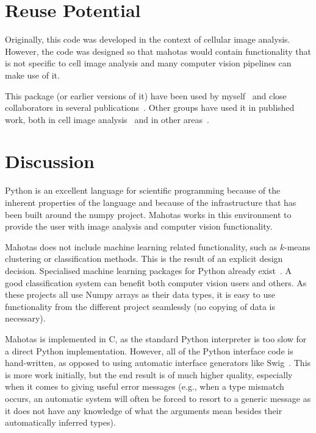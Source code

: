 \documentclass{scrartcl}
\newcommand*{\cpp}{{C\nolinebreak[4]\hspace{-.05em}\raisebox{.4ex}{\tiny\textbf{++}}}}
\begin{document}
\section{Reuse Potential}

Originally, this code was developed in the context of cellular image analysis.
However, the code was designed so that mahotas would contain functionality that
is not specific to cell image analysis and many computer vision pipelines can
make use of it.

This package (or earlier versions of it) have been used by
myself~\citep{Coelho2009,Coelho2010a} and close collaborators in several
publications~\citep{omerosearcher}. Other groups have used it in published
work, both in cell image analysis~\citep{CYTO:CYTO22034} and in other
areas~\citep{springerlink:10.1007/978-3-642-32335-5_2,ADFM:ADFM201300091}.

\section{Discussion}

Python is an excellent language for scientific programming because of the
inherent properties of the language and because of the infrastructure that has
been built around the numpy project. Mahotas works in this environment to
provide the user with image analysis and computer vision functionality.

Mahotas does not include machine learning related functionality, such as
$k$-means clustering or classification methods. This is the result of an
explicit design decision. Specialised machine learning packages for Python
already
exist~\citep{Pedregosa:2011:SML:2078183.2078195,springerlink:10.1007/978-3-540-30116-5_58,Schaul:2010:PYB:1756006.1756030,Sonnenburg:2010:SML:1756006.1859911}.
A good classification system can benefit both computer vision users
and others. As these projects all use Numpy arrays as their data types, it is
easy to use functionality from the different project seamlessly (no copying of
data is necessary).

Mahotas is implemented in \cpp{}, as the standard Python interpreter is too
slow for a direct Python implementation. However, all of the Python interface
code is hand-written, as opposed to using automatic interface generators like
Swig~\citep{Beazley2003599}. This is more work initially, but the end result is
of much higher quality, especially when it comes to giving useful error
messages (e.g., when a type mismatch occurs, an automatic system will often be
forced to resort to a generic message as it does not have any knowledge of what
the arguments mean besides their automatically inferred types).
\end{document}
